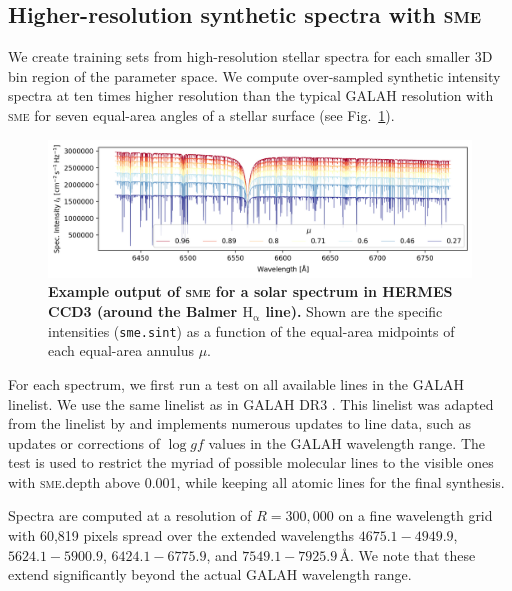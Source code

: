 \documentclass[
  journal=pasa,
  manuscript=research-paper, %
  year=2024,
  volume=37
]{cup-journal}
\newcommand{\sme}{\textsc{sme}\xspace}
\newcommand{\Angstroem}{\,\text{\AA}}	%
\begin{document}
\subsection{Higher-resolution synthetic spectra with \sme}
\label{sec:higher_resolution_synthetic_spectra}

We create training sets from high-resolution stellar spectra for each smaller 3D bin region of the parameter space. We compute over-sampled synthetic intensity spectra at ten times higher resolution than the typical GALAH resolution with \sme for seven equal-area angles of a stellar surface (see Fig.~\ref{fig:sme_mu_output}).

\begin{figure}[ht]
 \centering
 \includegraphics[width=\textwidth]{figures/solar_twin_specific_intensity.png}
 \caption{\textbf{Example output of \sme for a solar spectrum in HERMES CCD3 (around the Balmer $\mathrm{H}_\upalpha$ line).} Shown are the specific intensities (\texttt{sme.sint}) as a function of the equal-area midpoints of each equal-area annulus $\mu$.}
 \label{fig:sme_mu_output}
\end{figure}

For each spectrum, we first run a test on all available lines in the GALAH linelist. We use the same linelist as in GALAH DR3 \citep{Buder2021}. This linelist was adapted from the linelist by \citet{Heiter2021} and implements numerous updates to line data, such as updates or corrections of $\log gf$ values in the GALAH wavelength range. The test is used to restrict the myriad of possible molecular lines to the visible ones with \textsc{sme}.depth above 0.001, while keeping all atomic lines for the final synthesis.

Spectra are computed at a resolution of $R = 300,000$ on a fine wavelength grid with 60,819 pixels spread over the extended wavelengths $4675.1-4949.9$, $5624.1-5900.9$, $6424.1-6775.9$, and $7549.1-7925.9 \Angstroem$. We note that these extend significantly beyond the actual GALAH wavelength range.
\end{document}
